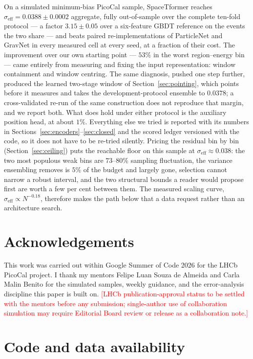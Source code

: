 \documentclass[11pt,a4paper]{article}
\newcommand{\seff}{\ensuremath{\sigma_{\mathrm{eff}}}}
\newcommand{\todo}[1]{\textcolor{red}{[#1]}}
\begin{document}
On a simulated minimum-bias PicoCal sample, SpaceTformer reaches
$\seff = 0.0388 \pm 0.0002$ aggregate, fully out-of-sample over the complete
ten-fold protocol --- a factor $3.15 \pm 0.05$ over a six-feature GBDT
reference on the events the two share --- and beats paired
re-implementations of ParticleNet and
GravNet in every measured cell at every seed, at a fraction of their cost.
The improvement over our own starting point --- $53\%$ in the worst
region--energy bin --- came entirely
from measuring and fixing the input representation: window containment and
window centring. The same diagnosis, pushed one step further, produced the
learned two-stage window of Section~\ref{sec:pointing}, which points
before it measures and takes the development-protocol ensemble to
$0.0378$; a cross-validated re-run of the same construction does not
reproduce that margin, and we report both. What does hold under either
protocol is the auxiliary position head, at about $1\%$. Everything else we tried is reported with its numbers in
Sections~\ref{sec:encoders}--\ref{sec:closed} and the scored
ledger versioned with the code, so it does not have to be re-tried silently.
Pricing the residual bin by bin (Section~\ref{sec:ceiling}) puts the reachable
floor on this sample at $\seff \approx 0.038$: the two most populous weak bins
are $73$--$80\%$ sampling fluctuation, the variance ensembling removes is $5\%$
of the budget and largely gone, selection cannot narrow a robust interval, and
the two structural bounds a reader would propose first are worth a few per cent
between them. The measured scaling curve, $\seff \propto N^{-0.18}$, therefore
makes the path below that a data request rather than an architecture search.

\section*{Acknowledgements}

This work was carried out within Google Summer of Code 2026 for the LHCb
PicoCal project. I thank my mentors Felipe Luan Souza de Almeida and Carla
Malin Benito for the simulated samples, weekly guidance, and the
error-analysis discipline this paper is built on. \todo{LHCb
publication-approval status to be settled with the mentors before any
submission; single-author use of collaboration simulation may require
Editorial Board review or release as a collaboration note.}

\section*{Code and data availability}
\end{document}
